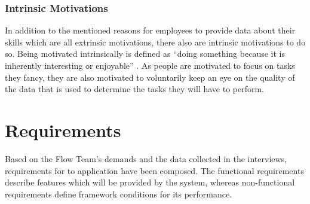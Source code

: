 \subsubsection{Intrinsic Motivations}
In addition to the mentioned reasons for employees to provide data about their skills which are all extrinsic motivations,
there also are intrinsic motivations to do so. Being motivated intrinsically is defined as ``doing something because it is inherently interesting or enjoyable'' \cite{RYAN200054}. As people are motivated to focus on tasks they fancy, they are also motivated to voluntarily keep an eye on the quality of the data that is used to determine the tasks they will have to perform.

\newpage

\section{Requirements}
Based on the Flow Team's demands and the data collected in the interviews, requirements for to application have been composed. The functional requirements describe features which will be provided by the system, whereas non-functional requirements define framework conditions for its performance.

\label{requirements}
